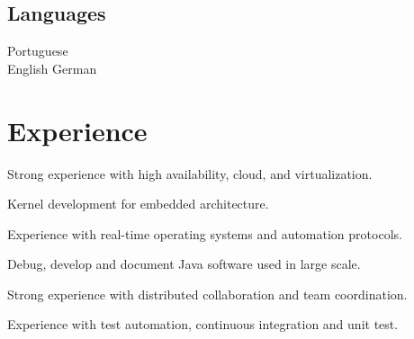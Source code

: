\documentclass[]{deedy-resume-openfont}
\begin{document}
\begin{minipage}[t]{0.33\textwidth}
\subsection{Languages}
Portuguese \\
English \textbullet{}
German

%
%

\end{minipage} 
\hfill
\begin{minipage}[t]{0.66\textwidth} 

\section{Experience}
\begin{tightemize}
\item Strong experience with high availability, cloud, and virtualization.
\item 
\item
\end{tightemize}
\sectionsep

\begin{tightemize}
\item Kernel development for embedded architecture.
\item Experience with real-time operating systems and automation protocols.
\item 
\end{tightemize}
\sectionsep

\begin{tightemize}
\item Debug, develop and document Java software used in large scale.
\item Strong experience with distributed collaboration and team coordination.
\item Experience with test automation, continuous integration and unit test.
\end{tightemize}
\sectionsep


\end{minipage}
\end{document}
